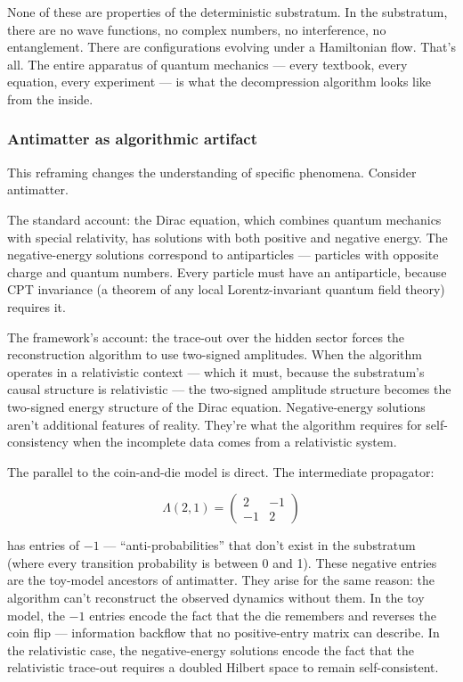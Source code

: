 \documentclass[
]{article}
\begin{document}
None of these are properties of the deterministic substratum. In the
substratum, there are no wave functions, no complex numbers, no
interference, no entanglement. There are configurations evolving under a
Hamiltonian flow. That's all. The entire apparatus of quantum mechanics
--- every textbook, every equation, every experiment --- is what the
decompression algorithm looks like from the inside.

\hypertarget{antimatter-as-algorithmic-artifact}{%
\subsubsection{Antimatter as algorithmic
artifact}\label{antimatter-as-algorithmic-artifact}}

This reframing changes the understanding of specific phenomena. Consider
antimatter.

The standard account: the Dirac equation, which combines quantum
mechanics with special relativity, has solutions with both positive and
negative energy. The negative-energy solutions correspond to
antiparticles --- particles with opposite charge and quantum numbers.
Every particle must have an antiparticle, because CPT invariance (a
theorem of any local Lorentz-invariant quantum field theory) requires
it.

The framework's account: the trace-out over the hidden sector forces the
reconstruction algorithm to use two-signed amplitudes. When the
algorithm operates in a relativistic context --- which it must, because
the substratum's causal structure is relativistic --- the two-signed
amplitude structure becomes the two-signed energy structure of the Dirac
equation. Negative-energy solutions aren't additional features of
reality. They're what the algorithm requires for self-consistency when
the incomplete data comes from a relativistic system.

The parallel to the coin-and-die model is direct. The intermediate
propagator:

\[\Lambda(2,1) = \begin{pmatrix} 2 & -1 \\ -1 & 2 \end{pmatrix}\]

has entries of \(-1\) --- ``anti-probabilities'' that don't exist in the
substratum (where every transition probability is between 0 and 1).
These negative entries are the toy-model ancestors of antimatter. They
arise for the same reason: the algorithm can't reconstruct the observed
dynamics without them. In the toy model, the \(-1\) entries encode the
fact that the die remembers and reverses the coin flip --- information
backflow that no positive-entry matrix can describe. In the relativistic
case, the negative-energy solutions encode the fact that the
relativistic trace-out requires a doubled Hilbert space to remain
self-consistent.
\end{document}
